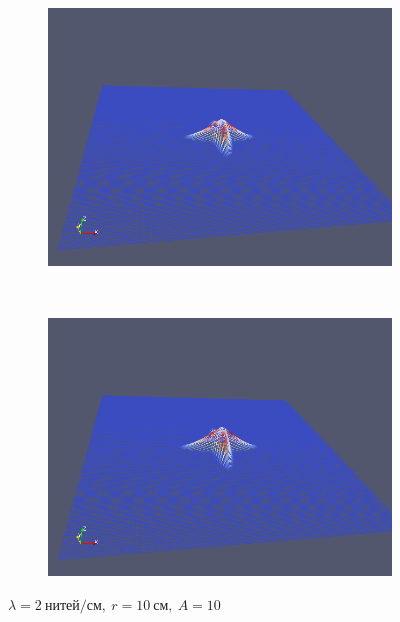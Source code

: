 \begin{figure}[H]
\begin{subfigure}[t]{0.5\textwidth}
        \includegraphics[width=\textwidth]{img/fiber/density_2_radius_10_amplitude_10/5.png}
    \end{subfigure}%
    ~
    \begin{subfigure}[t]{0.5\textwidth}
        \centering
        \includegraphics[width=\textwidth]{img/fiber/density_2_radius_10_amplitude_10/6.png}
    \end{subfigure}
    \caption{$\lambda=2~нитей/см,~r=10~см,~A=10$}
\end{figure}
